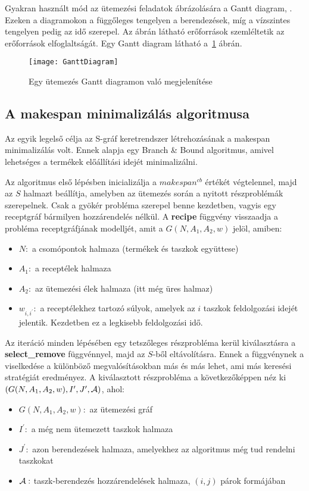 Gyakran használt mód az ütemezési feladatok ábrázolására a Gantt diagram\cite{ganttwwf}, \cite{ganttofw}.
Ezeken a diagramokon a függőleges tengelyen a berendezések, míg a vízszintes tengelyen pedig az idő szerepel.
Az ábrán látható erőforrások szemléltetik az erőforrások elfoglaltságát.
Egy Gantt diagram látható a~\ref{GanttDiagram} ábrán.
\begin{figure}[H]
\begin{center}
\texttt{[image: GanttDiagram]}
\caption{Egy ütemezés Gantt diagramon való megjelenítése}
\label{GanttDiagram}
\end{center}
\end{figure}

\subsection{A makespan minimalizálás algoritmusa}
Az egyik legelső célja az S-gráf keretrendszer létrehozásának a makespan minimalizálás volt.
Ennek alapja egy Branch \& Bound algoritmus, amivel lehetséges a termékek előállítási idejét minimalizálni.

Az algoritmus első lépésben inicializálja a $makespan^{cb}$ értékét végtelennel, majd az $S$ halmazt beállítja, amelyben az ütemezés során a nyitott részproblémák szerepelnek.
Csak a gyökér probléma szerepel benne kezdetben, vagyis egy receptgráf bármilyen hozzárendelés nélkül.
A \textbf{recipe} függvény visszaadja a probléma receptgráfjának modelljét, amit a $G(N,A_1,A_2,w)$ jelöl, amiben:
\begin{itemize}
	\item $N:$ a csomópontok halmaza (termékek és taszkok együttese)
	\item $A_{1}:$ a receptélek halmaza
	\item $A_{2}:$ az ütemezési élek halmaza (itt még üres halmaz)
	\item $w_{i,i^{'}}:$ a receptélekhez tartozó súlyok, amelyek az $i$ taszkok feldolgozási idejét jelentik.
	Kezdetben ez a legkisebb feldolgozási idő.
\end{itemize}

Az iteráció minden lépésében egy tetszőleges részprobléma kerül kiválasztásra a \textbf{select\_remove} függvénnyel, majd az $S$-ből eltávolításra.
Ennek a függvénynek a viselkedése a különböző megvalósításokban más és más lehet, ami más keresési stratégiát eredményez.
A kiválasztott részprobléma a következőképpen néz ki $(G(N,A_1,A_2,w),I',J',{\cal A})$, ahol:
\begin{itemize}
	\item $G(N,A_{1},A_{2},w):$ az ütemezési gráf
	\item $I^{'}:$ a még nem ütemezett taszkok halmaza
	\item $J^{'}:$ azon berendezések halmaza, amelyekhez az algoritmus még tud rendelni taszkokat 
	\item $\cal{A}:$ taszk-berendezés hozzárendelések halmaza, $(i,j)$ párok formájában 
\end{itemize}

